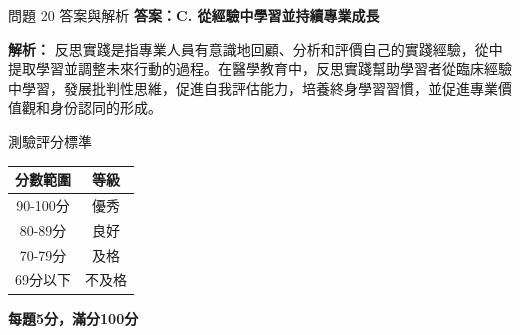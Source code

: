 \documentclass[aspectratio=169]{beamer}
\begin{document}
\begin{frame}{問題 20 答案與解析}
  \textbf{答案：C. 從經驗中學習並持續專業成長}
  
  \textbf{解析：} 反思實踐是指專業人員有意識地回顧、分析和評價自己的實踐經驗，從中提取學習並調整未來行動的過程。在醫學教育中，反思實踐幫助學習者從臨床經驗中學習，發展批判性思維，促進自我評估能力，培養終身學習習慣，並促進專業價值觀和身份認同的形成。
\end{frame}

\begin{frame}{測驗評分標準}
  \begin{center}
    \begin{tabular}{cc}
      \toprule
      \textbf{分數範圍} & \textbf{等級} \\
      \midrule
      90-100分 & 優秀 \\
      80-89分 & 良好 \\
      70-79分 & 及格 \\
      69分以下 & 不及格 \\
      \bottomrule
    \end{tabular}
  \end{center}
  
  \vspace{1cm}
  \begin{center}
    \Large{\textbf{每題5分，滿分100分}}
  \end{center}
\end{frame}
\end{document}
